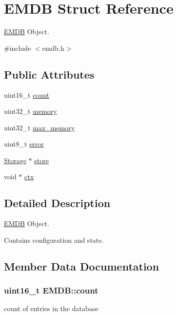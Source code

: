 \hypertarget{struct_e_m_d_b}{}\section{E\+M\+D\+B Struct Reference}
\label{struct_e_m_d_b}


\hyperlink{struct_e_m_d_b}{E\+M\+D\+B} Object.  




{\ttfamily \#include $<$emdb.\+h$>$}

\subsection*{Public Attributes}
\begin{DoxyCompactItemize}
\item 
uint16\+\_\+t \hyperlink{struct_e_m_d_b_af8d58f4313bf60ef13bae9e1aae57c4c}{count}
\item 
uint32\+\_\+t \hyperlink{struct_e_m_d_b_a0f1134b0c45750d0db8b9fd7efd10069}{memory}
\item 
uint32\+\_\+t \hyperlink{struct_e_m_d_b_a6fe1b09bdf8d8e0095f63c7a5a8e857c}{max\+\_\+memory}
\item 
uint8\+\_\+t \hyperlink{struct_e_m_d_b_ae32927fa60a17d82bf46e33433054272}{error}
\item 
\hyperlink{struct_storage}{Storage} $\ast$ \hyperlink{struct_e_m_d_b_a872289fb194a97cf2718c680a7cee154}{store}
\item 
void $\ast$ \hyperlink{struct_e_m_d_b_a726fbe533f115c88e1afb228a9a19116}{ctx}
\end{DoxyCompactItemize}


\subsection{Detailed Description}
\hyperlink{struct_e_m_d_b}{E\+M\+D\+B} Object. 

Contains configuration and state. 

\subsection{Member Data Documentation}
\hypertarget{struct_e_m_d_b_af8d58f4313bf60ef13bae9e1aae57c4c}{}
\subsubsection[{count}]{\setlength{\rightskip}{0pt plus 5cm}uint16\+\_\+t E\+M\+D\+B\+::count}\label{struct_e_m_d_b_af8d58f4313bf60ef13bae9e1aae57c4c}
count of entries in the database \hypertarget{struct_e_m_d_b_a726fbe533f115c88e1afb228a9a19116}{}
